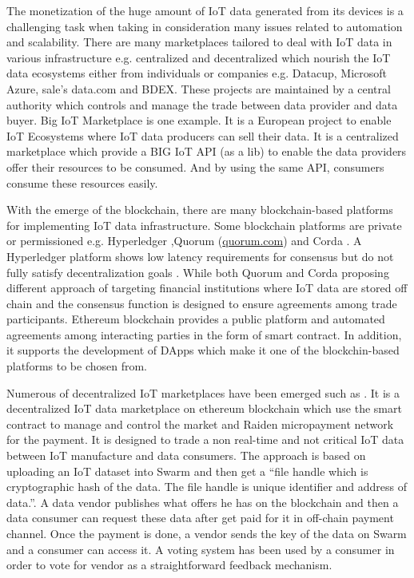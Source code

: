 \documentclass[letterpaper, 10 pt, conference]{ieeeconf}  %
\begin{document}
The monetization of the huge amount of IoT data generated from its devices is a challenging task when taking in consideration many issues related to automation and scalability. There are many marketplaces tailored to deal with IoT data in various infrastructure e.g. centralized and decentralized which nourish the IoT data ecosystems either from individuals or companies e.g. Datacup, Microsoft Azure, sale’s data.com and BDEX. These projects are maintained by a central authority which controls and manage the trade between data provider and data buyer. Big IoT Marketplace \cite{14} is one example. It is a European project to enable IoT Ecosystems where IoT data producers can sell their data. It is a centralized marketplace which provide a BIG IoT API (as a lib) to enable the data providers offer their resources to be consumed. And by using the same API, consumers consume these resources easily. 
 
 With the emerge of the blockchain, there are many blockchain-based platforms for implementing IoT data infrastructure. Some blockchain platforms are private or permissioned e.g. Hyperledger \cite{15},Quorum (\url{quorum.com}) \cite{16} and Corda \cite{17}. A Hyperledger platform shows low latency requirements for consensus but do not fully satisfy decentralization goals \cite{18}. While both Quorum and Corda proposing different approach of targeting financial institutions where IoT data are stored off chain and the consensus function is designed to ensure agreements among trade participants. Ethereum blockchain provides a public platform and automated agreements among interacting parties in the form of smart contract. In addition, it supports the development of DApps which make it one of the blockchin-based platforms to be chosen from. 

Numerous of decentralized IoT marketplaces  have been emerged such as \cite{18}. It is a decentralized IoT data marketplace on ethereum blockchain which use the smart contract to manage and control the market and Raiden micropayment network for the payment. It is designed to trade a non real-time and not critical IoT data between IoT manufacture and data consumers. The approach is based on uploading an IoT dataset into Swarm and then get a “file handle which is cryptographic hash of the data. The file handle is unique identifier and address of data.”. A data vendor publishes what offers he has on the blockchain and then a data consumer can request these data after get paid for it in off-chain payment channel. Once the payment is done, a vendor sends the key of the data on Swarm and a consumer can access it. A voting system has been used by a consumer in order to vote for vendor as a straightforward feedback mechanism. 
\end{document}
